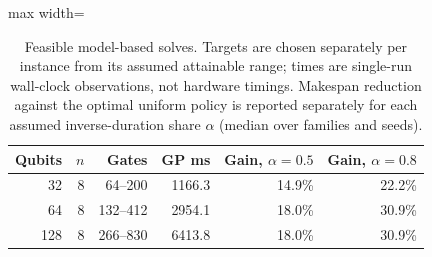 \begin{table}[t]
\centering
\caption{Feasible model-based solves. Targets are chosen separately per instance from its assumed attainable range; times are single-run wall-clock observations, not hardware timings. Makespan reduction against the optimal uniform policy is reported separately for each assumed inverse-duration share $\alpha$ (median over families and seeds).}
\label{tab:feasible_scale}
\footnotesize
\begin{adjustbox}{max width=\columnwidth}
\begin{tabular}{rrrrrr}
\toprule
Qubits & $n$ & Gates & GP ms & Gain, $\alpha=0.5$ & Gain, $\alpha=0.8$ \\
\midrule
32 & 8 & 64--200 & 1166.3 & 14.9\% & 22.2\% \\
64 & 8 & 132--412 & 2954.1 & 18.0\% & 30.9\% \\
128 & 8 & 266--830 & 6413.8 & 18.0\% & 30.9\% \\
\bottomrule
\end{tabular}
\end{adjustbox}
\end{table}
